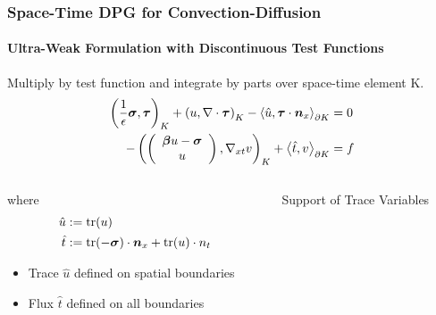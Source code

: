 \documentclass[18pt,xcolor=table]{beamer}
\begin{document}
\begin{frame}[t]
\frametitle{Space-Time DPG for Convection-Diffusion}
\framesubtitle{Ultra-Weak Formulation with Discontinuous Test Functions}  %
Multiply by test function and integrate by parts over space-time element K.
\begin{equation*}
\begin{aligned}
\left( \frac{1}{\epsilon}\boldsymbol\sigma,\boldsymbol\tau \right)_K+\left( u,\nabla\cdot\boldsymbol\tau \right)_K-\left\langle \hat u,\boldsymbol\tau\cdot\boldsymbol n_x \right\rangle_{\partial K}&=0\\
-\left( \left( \begin{array}{c} \boldsymbol\beta u-\boldsymbol\sigma\\ u\\ \end{array} \right),\nabla_{xt} v \right)_K+\left\langle \hat t,v \right\rangle_{\partial K}&=f
\end{aligned}
\end{equation*}
\begin{columns}[t] %
\begin{column}[T]{0.4\textwidth} %
where
\begin{align*}
\hat u&:=\operatorname*{tr}(u)\\
\hat t&:=\operatorname*{tr}(-\boldsymbol\sigma)\cdot\boldsymbol n_x+\operatorname*{tr}(u)\cdot n_t
\end{align*}
\vspace{-4ex}
\begin{itemize}
  \item Trace $\hat u$ defined on spatial boundaries
  \item Flux $\hat t$ defined on all boundaries
\end{itemize}
\end{column}
\begin{column}[T]{0.6\textwidth} %
\vspace{-2ex}
\begin{block}{Support of Trace Variables}
\end{block}
\end{column}
\end{columns}
\end{frame}
\end{document}
